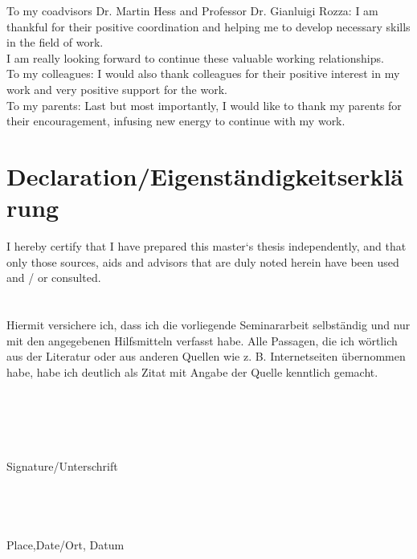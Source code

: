\documentclass[a4paper,openany]{book}
\begin{document}
To my coadvisors Dr. Martin Hess and Professor Dr. Gianluigi Rozza: I am thankful for their positive coordination and helping me to develop necessary skills in the field of work. \\

I am really looking forward to continue these valuable working relationships.\\

To my colleagues: I would also thank colleagues for their positive interest in my work and very positive support for the work.\\

To my parents:  Last but most importantly, I would like to thank my parents for their encouragement, infusing new energy to continue with my work.

\newpage

\section{Declaration/Eigenst\"andigkeitserkl\"arung}

I hereby certify that I have prepared this master‘s thesis independently, and that only those sources, aids and advisors that are duly noted herein have been used and / or consulted.\\
${}$\\
${}$\\
Hiermit versichere ich, dass ich die vorliegende Seminararbeit selbständig und
nur mit den angegebenen Hilfsmitteln verfasst habe. Alle Passagen, die ich
wörtlich aus der Literatur oder aus anderen Quellen wie z. B. Internetseiten
übernommen habe, habe ich deutlich als Zitat mit Angabe der Quelle kenntlich
gemacht.\\
${}$\\
${}$\\
${}$\\
${}$\\
${}$\\
Signature/Unterschrift
${}$\\
${}$\\
${}$\\
${}$\\
${}$\\
Place,Date/Ort, Datum











\newpage
\end{document}

